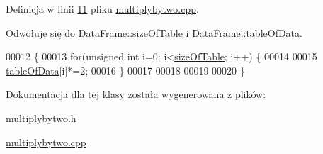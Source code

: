 Definicja w linii \hyperlink{multiplybytwo_8cpp_source_l00011}{11} pliku \hyperlink{multiplybytwo_8cpp_source}{multiplybytwo.\-cpp}.



Odwołuje się do \hyperlink{dataframe_8h_source_l00034}{Data\-Frame\-::size\-Of\-Table} i \hyperlink{dataframe_8h_source_l00021}{Data\-Frame\-::table\-Of\-Data}.


\begin{DoxyCode}
00012 \{
00013         \textcolor{keywordflow}{for}(\textcolor{keywordtype}{unsigned} \textcolor{keywordtype}{int} i=0; i<\hyperlink{class_data_frame_aa5d1905c6910cad07ab5189bd34b13ab}{sizeOfTable}; i++) \{
00014 
00015                 \hyperlink{class_data_frame_a8edc4ce524483e2e5069067267ccdcbf}{tableOfData}[i]*=2;
00016         \}
00017 
00018 
00019 
00020 \}
\end{DoxyCode}


Dokumentacja dla tej klasy została wygenerowana z plików\-:\begin{DoxyCompactItemize}
\item 
\hyperlink{multiplybytwo_8h}{multiplybytwo.\-h}\item 
\hyperlink{multiplybytwo_8cpp}{multiplybytwo.\-cpp}\end{DoxyCompactItemize}
